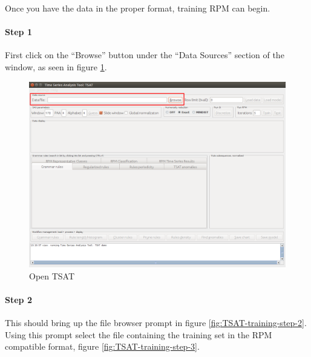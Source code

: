 \documentclass[titlepage, letterpaper, 12pt]{article}
\begin{document}
Once you have the data in the proper format, training RPM can begin.

\paragraph{Step 1}
First click on the ``Browse'' button under the ``Data Sources'' section of the window, as seen in figure \ref{fig:TSAT-training-step-1}. 

\begin{figure}[h]
	\includegraphics[width=\textwidth]{TSAT-training-step-1}
	\caption{Open TSAT}
	\label{fig:TSAT-training-step-1}
\end{figure}
\newpage
\paragraph{Step 2}
This should bring up the file browser prompt in figure \ref{fig:TSAT-training-step-2}. Using this prompt select the file containing the training set in the RPM compatible format, figure \ref{fig:TSAT-training-step-3}.
\end{document}

